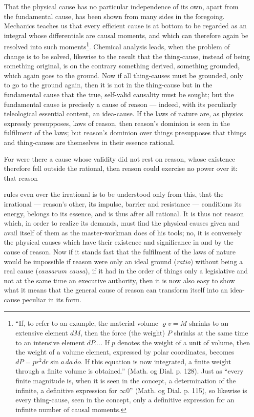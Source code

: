 \documentclass[12pt,a4paper]{book}
\begin{document}
\setcounter{footnote}{0}
That the physical cause has no particular independence of its own, apart from the
fundamental cause, has been shown from many sides in the foregoing. Mechanics
teaches us that every efficient cause is at bottom to be regarded as an integral
whose differentials are causal moments, and which can therefore again be
resolved into such moments\footnote{``If, to refer to an example, the material
volume $\varrho v = M$ shrinks to an extensive element $dM$, then the force (the
weight) $P$ shrinks at the same time to an intensive element $dP$.... If $p$
denotes the weight of a unit of volume, then the weight of a volume element,
expressed by polar coordinates, becomes $dP = pr^2 dr \sin a\, da\, do$. If this
equation is now integrated, a finite weight through a finite volume is
obtained.'' (Math. og Dial. p. 128). Just as ``every finite magnitude is, when
it is seen in the concept, a determination of the infinite, a definitive
expression for $\infty 0$'' (Math. og Dial. p. 115), so likewise is every
thing-cause, seen in the concept, only a definitive expression for an infinite
number of causal moments.}. Chemical analysis leads, when the problem of change
is to be solved, likewise to the result that the thing-cause, instead of being
something original, is on the contrary something derived, something grounded,
which again goes to the ground. Now if all thing-causes must be grounded, only to
go to the ground again, then it is not in the thing-cause but in the fundamental
cause that the true, self-valid causality must be sought; but the fundamental
cause is precisely a cause of reason --- indeed, with its peculiarly teleological
essential content, an idea-cause. If the laws of nature are, as physics expressly
presupposes, laws of reason, then reason's dominion is seen in the fulfilment of
the laws; but reason's dominion over things presupposes that things and
thing-causes are themselves in their essence rational.

For were there a cause whose validity did not rest on reason, whose existence
therefore fell outside the rational, then reason could exercise no power over it:
that reason

\setcounter{footnote}{0}
rules even over the irrational is to be understood only from this, that the
irrational --- reason's other, its impulse, barrier and resistance --- conditions
its energy, belongs to its essence, and is thus after all rational. It is thus
not reason which, in order to realize its demands, must find the physical causes
given and avail itself of them as the master-workman does of his tools; no, it is
conversely the physical causes which have their existence and significance in and
by the cause of reason. Now if it stands fast that the fulfilment of the laws of
nature would be impossible if reason were only an ideal ground (\textit{ratio})
without being a real cause (\textit{causarum causa}), if it had in the order of
things only a legislative and not at the same time an executive authority, then
it is now also easy to show what it means that the general cause of reason can
transform itself into an idea-cause peculiar in its form.
\end{document}
